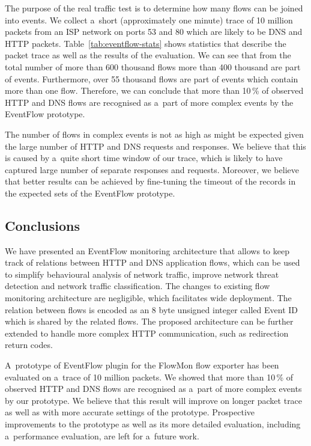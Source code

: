 The purpose of the real traffic test is to determine how many flows can be joined into events. We collect a~short (approximately one minute) trace of 10 million packets from an ISP network on ports 53 and 80 which are likely to be DNS and HTTP packets. Table~\ref{tab:eventflow-stats} shows statistics that describe the packet trace as well as the results of the evaluation. We can see that from the total number of more than 600 thousand flows more than 400 thousand are part of events. Furthermore, over 55 thousand flows are part of events which contain more than one flow. Therefore, we can conclude that more than 10\,\% of observed HTTP and DNS flows are recognised as a~part of more complex events by the EventFlow prototype.

The number of flows in complex events is not as high as might be expected given the large number of HTTP and DNS requests and responses. We believe that this is caused by a~quite short time window of our trace, which is likely to have captured large number of separate responses and requests. Moreover, we believe that better results can be achieved by fine-tuning the timeout of the records in the expected sets of the EventFlow prototype.


\subsection{Conclusions} \label{subsec:eventflow-conclusions}

We have presented an EventFlow monitoring architecture that allows to keep track of relations between HTTP and DNS application flows, which can be used to simplify behavioural analysis of network traffic, improve network threat detection and network traffic classification. The changes to existing flow monitoring architecture are negligible, which facilitates wide deployment. The relation between flows is encoded as an 8 byte unsigned integer called Event ID which is shared by the related flows. The proposed architecture can be further extended to handle more complex HTTP communication, such as redirection return codes.

A~prototype of EventFlow plugin for the FlowMon flow exporter has been evaluated on a~trace of 10 million packets. We showed that more than 10\,\% of observed HTTP and DNS flows are recognised as a~part of more complex events by our prototype. We believe that this result will improve on longer packet trace as well as with more accurate settings of the prototype. Prospective improvements to the prototype as well as its more detailed evaluation, including a~performance evaluation, are left for a~future work.

